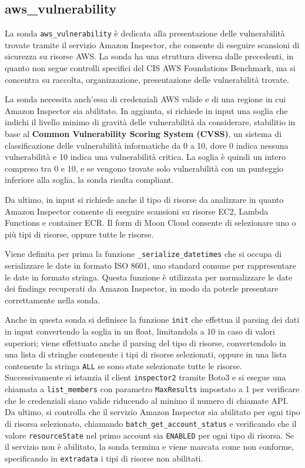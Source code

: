 \subsection{aws\_vulnerability}
\label{sec:vulnerability}

La sonda \texttt{aws\_vulnerability} è dedicata alla presentazione delle vulnerabilità trovate tramite il servizio Amazon Inspector, che consente di eseguire scansioni di sicurezza su risorse AWS. La sonda ha una struttura diversa dalle precedenti, in quanto non segue controlli specifici del CIS AWS Foundations Benchmark, ma si concentra su raccolta, organizzazione, presentazione delle vulnerabilità trovate.

La sonda necessita anch'essa di credenziali AWS valide e di una regione in cui Amazon Inspector sia abilitato. In aggiunta, si richiede in input una soglia che indichi il livello minimo di gravità delle vulnerabilità da considerare, stabilitio in base al \textbf{Common Vulnerability Scoring System (CVSS)}, un sistema di classificazione delle vulnerabilità informatiche da 0 a 10, dove 0 indica nessuna vulnerabilità e 10 indica una vulnerabilità critica. La soglia è quindi un intero compreso tra 0 e 10, e se vengono trovate solo vulnerabilità con un punteggio inferiore alla soglia, la sonda risulta compliant.

Da ultimo, in input si richiede anche il tipo di risorse da analizzare in quanto Amazon Inspector consente di eseguire scansioni su risorse EC2, Lambda Functions e container ECR. Il form di Moon Cloud consente di selezionare uno o più tipi di risorse, oppure tutte le risorse. 

Viene definita per prima la funzione \texttt{\_serialize\_datetimes} che si occupa di serializzare le date in formato ISO 8601, uno standard comune per rappresentare le date in formato stringa. Questa funzione è utilizzata per normalizzare le date dei findings recuperati da Amazon Inspector, in modo da poterle presentare correttamente nella sonda.

Anche in questa sonda si definisce la funzione \texttt{init} che effettua il parsing dei dati in input convertendo la soglia in un float, limitandola a 10 in caso di valori superiori; viene effettuato anche il parsing del tipo di risorse, convertendolo in una lista di stringhe contenente i tipi di risorse selezionati, oppure in una lista contenente la stringa \texttt{ALL} se sono state selezionate tutte le risorse. Successivamente si istanzia il client \texttt{inspector2} tramite Boto3 e si esegue una chiamata a \texttt{list\_members} con parametro \texttt{MaxResults} impostato a 1 per verificare che le credenziali siano valide riducendo al minimo il numero di chiamate API. Da ultimo, si controlla che il servizio Amazon Inspector sia abilitato per ogni tipo di risorsa selezionato, chiamando \texttt{batch\_get\_account\_status} e verificando che il valore \texttt{resourceState} nel primo account sia \texttt{ENABLED} per ogni tipo di risorsa. Se il servizio non è abilitato, la sonda termina e viene marcata come non conforme, specificando in \texttt{extradata} i tipi di risorse non abilitati. 


